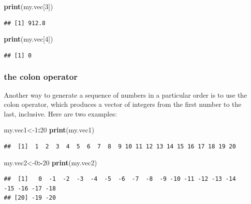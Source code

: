 \documentclass[
]{book}
\newenvironment{Shaded}{\begin{snugshade}}{\end{snugshade}}
\newcommand{\DecValTok}[1]{\textcolor[rgb]{0.00,0.00,0.81}{#1}}
\newcommand{\KeywordTok}[1]{\textcolor[rgb]{0.13,0.29,0.53}{\textbf{#1}}}
\newcommand{\NormalTok}[1]{#1}
\newcommand{\OperatorTok}[1]{\textcolor[rgb]{0.81,0.36,0.00}{\textbf{#1}}}
\theoremstyle{definition}
\theoremstyle{definition}
\theoremstyle{definition}
\theoremstyle{remark}
\begin{document}
\begin{Shaded}
\begin{Highlighting}[]
\KeywordTok{print}\NormalTok{(my.vec[}\DecValTok{3}\NormalTok{])}
\end{Highlighting}
\end{Shaded}

\begin{verbatim}
## [1] 912.8
\end{verbatim}

\begin{Shaded}
\begin{Highlighting}[]
\KeywordTok{print}\NormalTok{(my.vec[}\DecValTok{4}\NormalTok{])}
\end{Highlighting}
\end{Shaded}

\begin{verbatim}
## [1] 0
\end{verbatim}

\hypertarget{the-colon-operator}{%
\subsubsection{the colon operator}\label{the-colon-operator}}

Another way to generate a sequence of numbers in a particular order is to use the colon operator, which produces a vector of integers from the first number to the last, inclusive. Here are two examples:

\begin{Shaded}
\begin{Highlighting}[]
\NormalTok{my.vec1\textless{}{-}}\DecValTok{1}\OperatorTok{:}\DecValTok{20}
\KeywordTok{print}\NormalTok{(my.vec1)}
\end{Highlighting}
\end{Shaded}

\begin{verbatim}
##  [1]  1  2  3  4  5  6  7  8  9 10 11 12 13 14 15 16 17 18 19 20
\end{verbatim}

\begin{Shaded}
\begin{Highlighting}[]
\NormalTok{my.vec2\textless{}{-}}\DecValTok{0}\OperatorTok{:{-}}\DecValTok{20}
\KeywordTok{print}\NormalTok{(my.vec2)}
\end{Highlighting}
\end{Shaded}

\begin{verbatim}
##  [1]   0  -1  -2  -3  -4  -5  -6  -7  -8  -9 -10 -11 -12 -13 -14 -15 -16 -17 -18
## [20] -19 -20
\end{verbatim}
\end{document}
